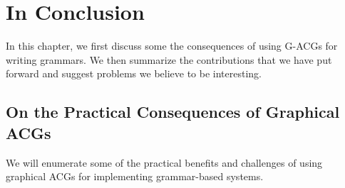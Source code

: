 \chapter{In Conclusion}
\label{chap:conclusion}

In this chapter, we first discuss some the consequences of using G-ACGs
for writing grammars. We then summarize the contributions that we have
put forward and suggest problems we believe to be interesting.

\section{On the Practical Consequences of Graphical ACGs}
\label{sec:practical}

We will enumerate some of the practical benefits and challenges of using
graphical ACGs for implementing grammar-based systems.

